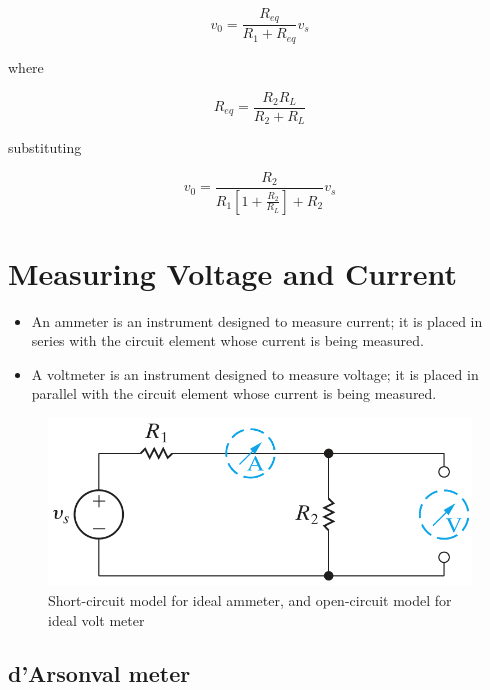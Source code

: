 \documentclass[14pt]{memoir}
\begin{document}
\begin{equation}
v_0 = \frac{R_{eq}}{R_1+R_{eq}} v_s
\end{equation}

where

\begin{equation}
R_{eq} = \frac{R_2 R_L}{R_2 + R_L}
\end{equation}

substituting 

\begin{equation}
v_0 = \frac{R_2}{R_1 [1 + \frac{R_2}{R_L}] + R_2} v_s
\end{equation}

\section{Measuring Voltage and Current}

\begin{itemize}
\item An ammeter is an instrument designed to measure current; it is placed in series with the circuit element whose current is being measured. 
\item A voltmeter is an instrument designed to measure voltage; it is placed in parallel with the circuit element whose current is being measured. 
\end{itemize}

\begin{figure}[H]
\begin{center}
\includegraphics[scale=0.50]{fig/fig03_24.png}
\caption{Short-circuit model for ideal ammeter, and open-circuit model for ideal volt meter}
\label{fig:fig03_24}
\end{center}
\end{figure}

\subsection{d'Arsonval meter}
\end{document}
